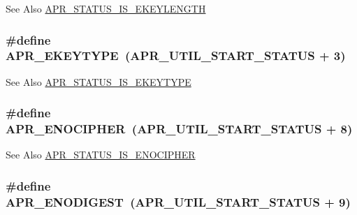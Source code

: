 \begin{DoxySeeAlso}{See Also}
\hyperlink{group___a_p_r___util___error_gab705e1d1975634114d47197609b97cbf}{A\-P\-R\-\_\-\-S\-T\-A\-T\-U\-S\-\_\-\-I\-S\-\_\-\-E\-K\-E\-Y\-L\-E\-N\-G\-T\-H} 
\end{DoxySeeAlso}
\hypertarget{group___a_p_r___util___error_ga637727cdf8285d12663ddf8bb89fa048}{
\subsubsection[{A\-P\-R\-\_\-\-E\-K\-E\-Y\-T\-Y\-P\-E}]{\setlength{\rightskip}{0pt plus 5cm}\#define A\-P\-R\-\_\-\-E\-K\-E\-Y\-T\-Y\-P\-E~(A\-P\-R\-\_\-\-U\-T\-I\-L\-\_\-\-S\-T\-A\-R\-T\-\_\-\-S\-T\-A\-T\-U\-S + 3)}}\label{group___a_p_r___util___error_ga637727cdf8285d12663ddf8bb89fa048}
\begin{DoxySeeAlso}{See Also}
\hyperlink{group___a_p_r___util___error_ga0693be89f2dc48f2931ff4572bd5872d}{A\-P\-R\-\_\-\-S\-T\-A\-T\-U\-S\-\_\-\-I\-S\-\_\-\-E\-K\-E\-Y\-T\-Y\-P\-E} 
\end{DoxySeeAlso}
\hypertarget{group___a_p_r___util___error_ga6b546475980180206e4286e35befaf55}{
\subsubsection[{A\-P\-R\-\_\-\-E\-N\-O\-C\-I\-P\-H\-E\-R}]{\setlength{\rightskip}{0pt plus 5cm}\#define A\-P\-R\-\_\-\-E\-N\-O\-C\-I\-P\-H\-E\-R~(A\-P\-R\-\_\-\-U\-T\-I\-L\-\_\-\-S\-T\-A\-R\-T\-\_\-\-S\-T\-A\-T\-U\-S + 8)}}\label{group___a_p_r___util___error_ga6b546475980180206e4286e35befaf55}
\begin{DoxySeeAlso}{See Also}
\hyperlink{group___a_p_r___util___error_ga8b6a993f66cfa692820018a7a0bf7ee6}{A\-P\-R\-\_\-\-S\-T\-A\-T\-U\-S\-\_\-\-I\-S\-\_\-\-E\-N\-O\-C\-I\-P\-H\-E\-R} 
\end{DoxySeeAlso}
\hypertarget{group___a_p_r___util___error_ga93f22e73099e3cd744ea96da38602065}{
\subsubsection[{A\-P\-R\-\_\-\-E\-N\-O\-D\-I\-G\-E\-S\-T}]{\setlength{\rightskip}{0pt plus 5cm}\#define A\-P\-R\-\_\-\-E\-N\-O\-D\-I\-G\-E\-S\-T~(A\-P\-R\-\_\-\-U\-T\-I\-L\-\_\-\-S\-T\-A\-R\-T\-\_\-\-S\-T\-A\-T\-U\-S + 9)}}\label{group___a_p_r___util___error_ga93f22e73099e3cd744ea96da38602065}
